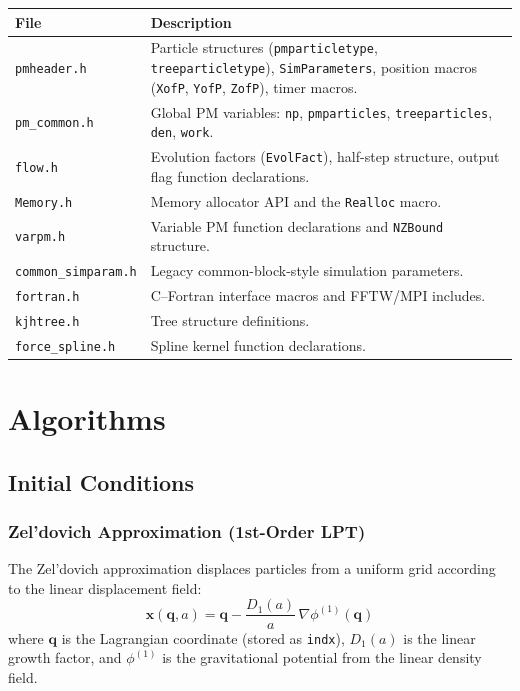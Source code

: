 \documentclass[11pt,fleqn]{book}
\newcommand{\code}[1]{\texttt{#1}}
\newcommand{\file}[1]{\texttt{#1}}
\begin{document}
\begin{longtable}{L{4.5cm} L{9cm}}
\toprule
\textbf{File} & \textbf{Description} \\
\midrule
\endhead
\file{pmheader.h} & Particle structures (\code{pmparticletype}, \code{treeparticletype}), \code{SimParameters}, position macros (\code{XofP}, \code{YofP}, \code{ZofP}), timer macros. \\
\file{pm\_common.h} & Global PM variables: \code{np}, \code{pmparticles}, \code{treeparticles}, \code{den}, \code{work}. \\
\file{flow.h} & Evolution factors (\code{EvolFact}), half-step structure, output flag function declarations. \\
\file{Memory.h} & Memory allocator API and the \code{Realloc} macro. \\
\file{varpm.h} & Variable PM function declarations and \code{NZBound} structure. \\
\file{common\_simparam.h} & Legacy common-block-style simulation parameters. \\
\file{fortran.h} & C--Fortran interface macros and FFTW/MPI includes. \\
\file{kjhtree.h} & Tree structure definitions. \\
\file{force\_spline.h} & Spline kernel function declarations. \\
\bottomrule
\end{longtable}


\part{Algorithms}

\chapter{Initial Conditions}
\label{ch:ic}

\section{Zel'dovich Approximation (1st-Order LPT)}

The Zel'dovich approximation displaces particles from a uniform grid according to the linear displacement field:
\begin{equation}
  \mathbf{x}(\mathbf{q}, a) = \mathbf{q} - \frac{D_1(a)}{a}\,\nabla\phi^{(1)}(\mathbf{q})
\end{equation}
where $\mathbf{q}$ is the Lagrangian coordinate (stored as \code{indx}), $D_1(a)$ is the linear growth factor, and $\phi^{(1)}$ is the gravitational potential from the linear density field.
\end{document}
